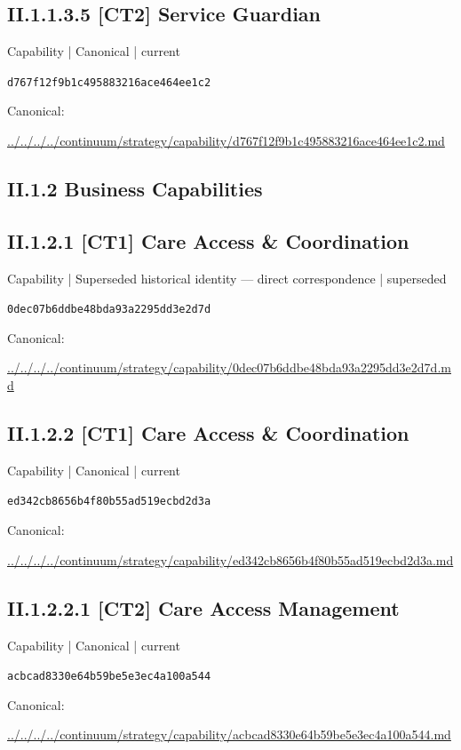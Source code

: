 \documentclass[10pt,a4paper]{article}
\begin{document}
\subsection*{II.1.1.3.5 [CT2] Service Guardian}
{\small Capability | Canonical | current}\par
\texttt{d767f12f9b1c495883216ace464ee1c2}\par
Canonical: \par
{\footnotesize\url{../../../../continuum/strategy/capability/d767f12f9b1c495883216ace464ee1c2.md}}\par
\subsection*{II.1.2 Business Capabilities}
\subsection*{II.1.2.1 [CT1] Care Access \& Coordination}
{\small Capability | Superseded historical identity — direct correspondence | superseded}\par
\texttt{0dec07b6ddbe48bda93a2295dd3e2d7d}\par
Canonical: \par
{\footnotesize\url{../../../../continuum/strategy/capability/0dec07b6ddbe48bda93a2295dd3e2d7d.md}}\par
\subsection*{II.1.2.2 [CT1] Care Access \& Coordination}
{\small Capability | Canonical | current}\par
\texttt{ed342cb8656b4f80b55ad519ecbd2d3a}\par
Canonical: \par
{\footnotesize\url{../../../../continuum/strategy/capability/ed342cb8656b4f80b55ad519ecbd2d3a.md}}\par
\subsection*{II.1.2.2.1 [CT2] Care Access Management}
{\small Capability | Canonical | current}\par
\texttt{acbcad8330e64b59be5e3ec4a100a544}\par
Canonical: \par
{\footnotesize\url{../../../../continuum/strategy/capability/acbcad8330e64b59be5e3ec4a100a544.md}}\par
\end{document}
